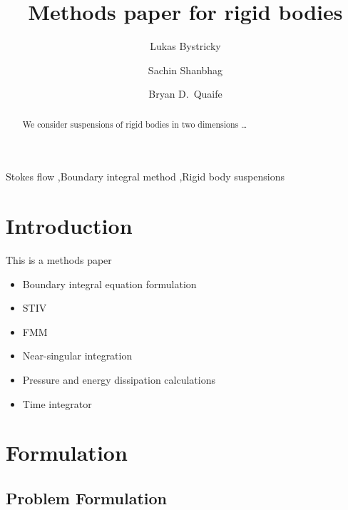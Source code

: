 \documentclass[preprint, 10pt]{elsarticle}
\begin{document}
\title{Methods paper for rigid bodies}

\author[Lukas]{Lukas Bystricky}
\author[Lukas]{Sachin Shanbhag}
\author[Bryan]{Bryan D.~Quaife}
\address[Lukas]{Department of Scientific Computing, Florida State University,
Tallahassee, FL, 32306.}
\address[Bryan]{Department of Scientific Computing and Geophysical Fluid
Dynamics Institute, Florida State University, Tallahassee, FL, 32306.}

\begin{abstract} 
We consider suspensions of rigid bodies in two dimensions \ldots
\end{abstract}

\begin{keyword}
  Stokes flow \sep Boundary integral method \sep Rigid body suspensions 
\end{keyword}

\maketitle





\section{Introduction\label{s:intro}}


This is a methods paper
\begin{itemize}
  \item Boundary integral equation formulation
  \item STIV
  \item FMM
  \item Near-singular integration
  \item Pressure and energy dissipation calculations
  \item Time integrator
\end{itemize}




\section{Formulation\label{s:formulation}} 
\subsection{Problem Formulation}
\end{document}

